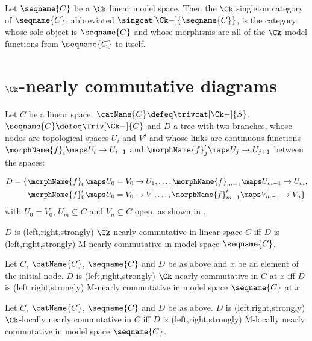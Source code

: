 \documentclass{article}
\begin{document}
\begin{definition}
\label {def:singCk}
Let $\seqname{C}$ be a $\Ck$ linear model space. Then the $\Ck$
singleton category of $\seqname{C}$, abbreviated
$\singcat[\Ck-]{\seqname{C}}$, is the category whose sole object is
$\seqname{C}$ and whose morphisms are all of the $\Ck$ model functions
from $\seqname{C}$ to itself.
\end{definition}

\section{$\Ck$-nearly commutative diagrams}
\label{sec:Ck-NCD}
Let $C$ be a linear space, $\catName{C} \defeq \trivcat[\Ck-]{S}$,
$\seqname{C} \defeq \Triv[\Ck-]{C}$ and $D$ a tree with two branches,
whose nodes are topological spaces $U_i$ and $V^j$ and whose links are
continuous functions $\morphName{f}_i \maps U_i \to U_{i+1}$ and
$\morphName{f}'_j \maps U_j \to U_{j+1}$ between the spaces:

\begin{align*}
D = \{
  &
    \morphName{f}_0 \maps U_0 = V_0 \to U_1,
    \dotsc,
    \morphName{f}_{m - 1} \maps U_{m - 1} \to U_m,
\\
  &
    \morphName{f}'_0 \maps  U_0 = V_0 \to V_1,
    \dotsc,
    \morphName{f}'_{m-1} \maps V_{m-1} \to V_n
\}
\end{align*}
with $U_0 = V_0$, $U_m \subseteq C$ and $V_n \subseteq C$ open, as shown
in .

\begin{definition}
\label{def:Ck-NCD}
$D$ is (left,right,strongly) $\Ck$-nearly commutative in linear space
$C$ iff $D$ is (left,right,strongly) M-nearly commutative in model space
$\seqname{C}$.

\end{definition}

\begin{definition}
\label{def:Ck-NCDp}
Let $C$, $\catName{C}$, $\seqname{C}$ and $D$ be as above and $x$ be an
element of the initial node. $D$ is (left,right,strongly) $\Ck$-nearly
commutative in $C$ at $x$ iff $D$ is (left,right,strongly) M-nearly
commutative in model space $\seqname{C}$ at $x$.

\end{definition}

\begin{definition}
\label{def:Ck-NCDl}
Let $C$, $\catName{C}$, $\seqname{C}$ and $D$ be as above. $D$ is
(left,right,strongly) $\Ck$-locally nearly commutative in $C$ iff $D$ is
(left,right,strongly) M-locally nearly commutative in model space
$\seqname{C}$.

\end{definition}
\end{document}
